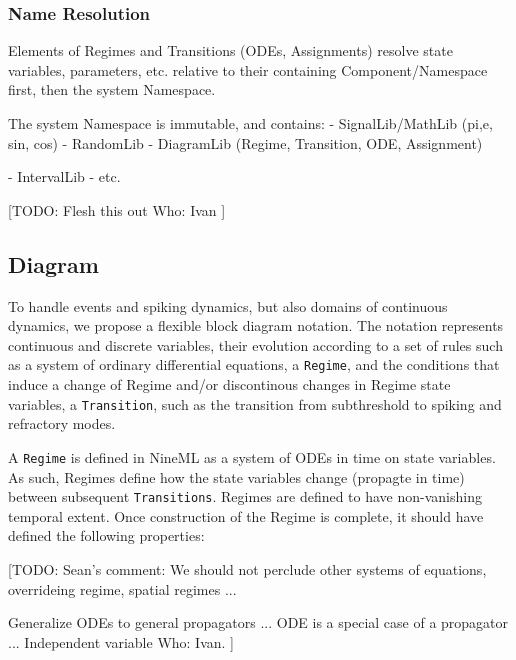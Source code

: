 \documentclass[a4paper]{article}
\newcommand\nmlClass[1]{{\tt #1}}
\begin{document}
\subsubsection{Name Resolution}

Elements of Regimes and Transitions (ODEs, Assignments) resolve state
variables, parameters, etc. relative to their containing
Component/Namespace first, then the system Namespace.

The system Namespace is immutable, and contains:
- SignalLib/MathLib (pi,e, sin, cos)
- RandomLib
- DiagramLib (Regime, Transition, ODE, Assignment)

- IntervalLib
- etc.

[TODO:
Flesh this out
Who: Ivan
]




\subsection{Diagram}


To handle events and spiking dynamics, but also domains of continuous
dynamics, we propose a flexible block diagram notation.  The notation
represents continuous and discrete variables, their evolution
according to a set of rules such as a system of ordinary differential
equations, a \nmlClass{Regime}, and the conditions that induce a change of
Regime and/or discontinous changes in Regime state variables, a
\nmlClass{Transition}, such as the transition from subthreshold to
spiking and refractory modes.


A \nmlClass{Regime} is defined in NineML as a system of ODEs in time on
state variables.  As such, Regimes define how the state variables
change (propagte in time) between subsequent \nmlClass{Transitions}.
Regimes are defined to have non-vanishing temporal extent.  Once
construction of the Regime is complete, it should have defined the
following properties:

[TODO:
Sean's comment:
We should not perclude other systems of equations,
overrideing regime, spatial regimes ...

Generalize ODEs to general propagators ...
ODE is a special case of a propagator ...
Independent variable
Who: Ivan.
]
\end{document}
